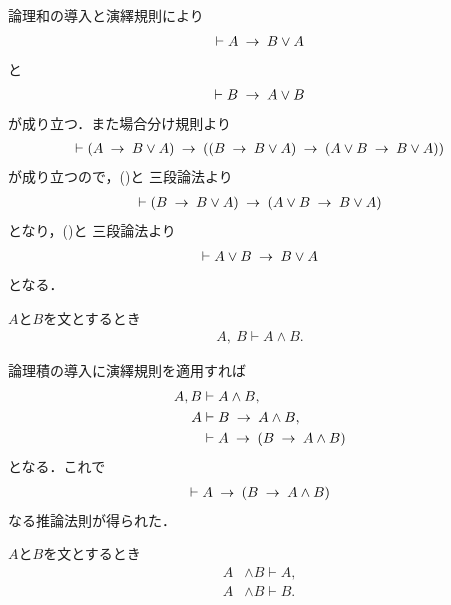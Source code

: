 	\begin{prf}
		論理和の導入と演繹規則により
		\begin{align}
			\vdash A \hspace{0.25em}\rightarrow\hspace{0.25em} B \vee A
			\label{fom:logicalthm_commutative_law_of_disjunction_1}
		\end{align}
		と
		\begin{align}
			\vdash B \hspace{0.25em}\rightarrow\hspace{0.25em} A \vee B
			\label{fom:logicalthm_commutative_law_of_disjunction_2}
		\end{align}
		が成り立つ．また場合分け規則より
		\begin{align}
			\vdash (A \hspace{0.25em}\rightarrow\hspace{0.25em} B \vee A) \hspace{0.25em}\rightarrow\hspace{0.25em} ((B \hspace{0.25em}\rightarrow\hspace{0.25em} B \vee A) 
			\hspace{0.25em}\rightarrow\hspace{0.25em} (A \vee B \hspace{0.25em}\rightarrow\hspace{0.25em} B \vee A))
		\end{align}
		が成り立つので，()と
		三段論法より
		\begin{align}
			\vdash (B \hspace{0.25em}\rightarrow\hspace{0.25em} B \vee A) \hspace{0.25em}\rightarrow\hspace{0.25em} (A \vee B \hspace{0.25em}\rightarrow\hspace{0.25em} B \vee A)
		\end{align}
		となり，()と
		三段論法より
		\begin{align}
			\vdash A \vee B \hspace{0.25em}\rightarrow\hspace{0.25em} B \vee A
		\end{align}
		となる．
		\QED
	\end{prf}
	
	\begin{screen}
		\begin{logicalaxm}[論理積の導入]
		\label{logicalaxm:introduction_of_conjunction}
			$A$と$B$を文とするとき
			\begin{align}
				A,\ B \vdash A \wedge B.
			\end{align}
		\end{logicalaxm}
	\end{screen}
	
	論理積の導入に演繹規則を適用すれば
	\begin{align}
		A,B &\vdash A \wedge B, \\
		A &\vdash B \hspace{0.25em}\rightarrow\hspace{0.25em} A \wedge B, \\
		&\vdash A \hspace{0.25em}\rightarrow\hspace{0.25em} (B \hspace{0.25em}\rightarrow\hspace{0.25em} A \wedge B)
	\end{align}
	となる．これで
	\begin{align}
		\vdash A \hspace{0.25em}\rightarrow\hspace{0.25em} (B \hspace{0.25em}\rightarrow\hspace{0.25em} A \wedge B)
	\end{align}
	なる推論法則が得られた．
	
	\begin{screen}
		\begin{logicalaxm}[論理積の除去]
		\label{logicalaxm:elimination_of_conjunction}
			$A$と$B$を文とするとき
			\begin{align}
				A &\wedge B \vdash A, \\
				A &\wedge B \vdash B.
			\end{align}
		\end{logicalaxm}
	\end{screen}
	
